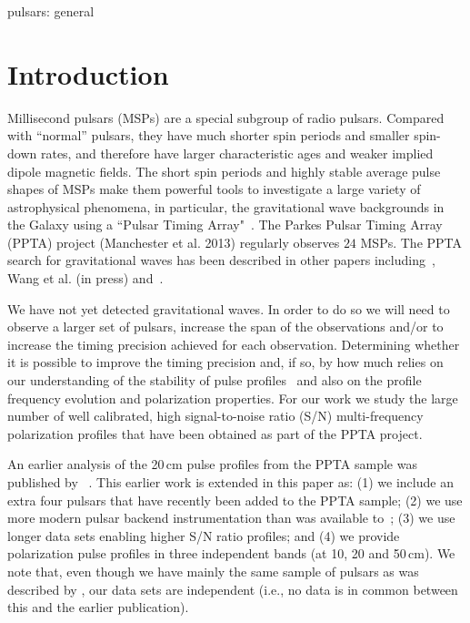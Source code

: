 \documentclass[useAMS,usenatbib]{mn2e}
\begin{document}
\begin{keywords}
%
pulsars: general
%
\end{keywords}


\section{Introduction}

Millisecond pulsars (MSPs) are a special subgroup of radio pulsars. 
%
Compared with ``normal'' pulsars, they have much shorter spin periods 
and smaller spin-down rates, and therefore have larger characteristic 
ages and weaker implied dipole magnetic fields.
%
The short spin periods and highly stable average pulse shapes of MSPs 
make them powerful tools to investigate a large variety of astrophysical phenomena,
in particular, the gravitational wave backgrounds in the Galaxy using 
a ``Pulsar Timing Array"~\citep[e.g.,][]{Foster90}.
%
The Parkes Pulsar Timing Array (PPTA) project (Manchester et al. 2013) 
regularly observes $24$ MSPs. 
%
The PPTA search for gravitational waves has been described in other papers 
including~\citet{Shannon13b}, Wang et al. (in press) and~\citet{Zhu14}. 
%

We have not yet detected gravitational waves. In order to do so we will need 
to observe a larger set of pulsars, increase the span of the observations and/or 
to increase the timing precision achieved for each observation. 
%
%
%
Determining whether it is possible to improve the timing precision and, if so, 
by how much relies on our understanding of the stability of pulse profiles~\citep[e.g.,][]{Shannon14} 
and also on the profile frequency evolution and polarization properties.
%
For our work we study the large number of well calibrated, high signal-to-noise 
ratio (S/N) multi-frequency polarization profiles that have been obtained as 
part of the PPTA project. 
%

An earlier analysis of the 20\,cm pulse profiles from the PPTA sample was published by
~\citet{Yan11}. This earlier work is extended in this paper as:
%
(1) we include an extra four pulsars that have recently been added to the PPTA sample;
(2) we use more modern pulsar backend instrumentation than was available to~\citet{Yan11};
(3) we use longer data sets enabling higher S/N ratio profiles; and
(4) we provide polarization pulse profiles in three independent bands 
(at 10, 20 and 50\,cm).
%
We note that, even though we have mainly the same sample of pulsars as was described by \citet{Yan11}, 
our data sets are independent (i.e., no data is in common between this and the earlier 
publication).
\end{document}
